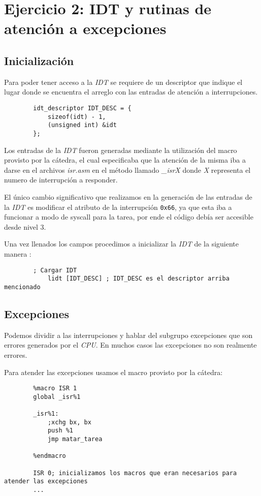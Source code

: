 \section{Ejercicio 2: IDT y rutinas de atención a excepciones}

	\subsection{Inicialización}

	Para poder tener acceso a la \textit{IDT} se requiere de un descriptor que indique el lugar donde se encuentra el arreglo con las entradas de atención a interrupciones. 

	\begin{lstlisting}
		idt_descriptor IDT_DESC = {
	    	sizeof(idt) - 1,
	    	(unsigned int) &idt
		};
	\end{lstlisting}

	Los entradas de la \textit{IDT} fueron generadas mediante la utilización del macro provisto por la cátedra, el cual especificaba que la atención de la misma iba a darse en el archivos \textit{isr.asm} en el método llamado \textit{\_isrX} donde \textit{X} representa el numero de interrupción a responder. 

	El único cambio significativo que realizamos en la generación de las entradas de la \textit{IDT} es modificar el atributo de la interrupción \texttt{0x66}, ya que esta iba a funcionar a modo de syscall para la tarea, por ende el código debía ser accesible desde nivel 3. 

	Una vez llenados los campos procedimos a inicializar la \textit{IDT} de la siguiente manera :

	\begin{lstlisting}
   		; Cargar IDT
    		lidt [IDT_DESC] ; IDT_DESC es el descriptor arriba mencionado
	\end{lstlisting}

	\subsection{Excepciones}

	Podemos dividir a las interrupciones y hablar del subgrupo excepciones que son errores generados por el \textit{CPU}. En muchos casos las excepciones no son realmente errores.

	Para atender las excepciones usamos el macro provisto por la cátedra:

	\begin{lstlisting}
   		%macro ISR 1
		global _isr%1

		_isr%1:
		    ;xchg bx, bx
		    push %1
		    jmp matar_tarea

		%endmacro

		ISR 0; inicializamos los macros que eran necesarios para atender las excepciones
		...
	\end{lstlisting}

